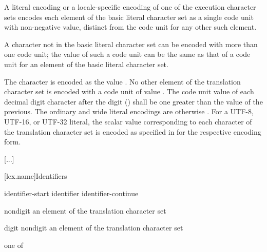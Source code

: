 \documentclass{wg21}
\newcommand{\replaceucs}{\changed{UCS}{Unicode}}
\begin{document}
\pnum
A literal encoding or a locale-specific encoding of one of
the execution character sets
encodes each element of the basic literal character set as
a single code unit with non-negative value,
distinct from the code unit for any other such element.
\begin{note}
    A character not in the basic literal character set
    can be encoded with more than one code unit;
    the value of such a code unit can be the same as
    that of a code unit for an element of the basic literal character set.
\end{note}
%
%
The  character is encoded as the value .
No other element of the translation character set
is encoded with a code unit of value .
The code unit value of each decimal digit character after the digit  ()
shall be one greater than the value of the previous.
The ordinary and wide literal encodings are otherwise
.
%
%
%
For a UTF-8, UTF-16, or UTF-32 literal,
the \replaceucs{} scalar value
corresponding to each character of the translation character set
is encoded as specified in  for the respective \replaceucs{} encoding form.

\textcolor{noteclr}{[...]}

[lex.name]{Identifiers}

%
\begin{bnf}
    \br
    identifier-start\br
    identifier identifier-continue
\end{bnf}

\begin{bnf}
    \br
    nondigit\br
    \textnormal{an element of the translation character set }
\end{bnf}

\begin{bnf}
    \br
    digit\br
    nondigit\br
    \textnormal{an element of the translation character set }
\end{bnf}

\begin{bnf}
     \textnormal{one of}\br
    \br
    \br
    \br
\end{bnf}
\end{document}
